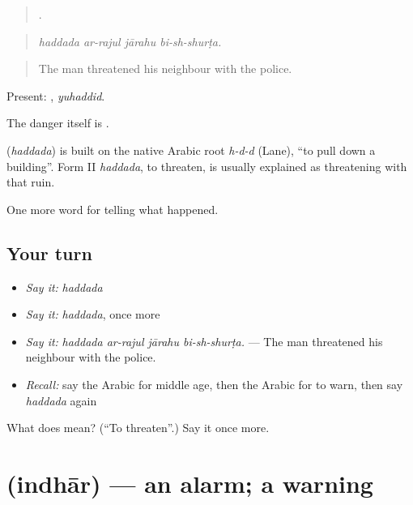 \begin{quote}
   .
\end{quote}

\begin{quote}
\emph{haddada ar-rajul jārahu bi-sh-shurṭa.}
\end{quote}

\begin{quote}
The man threatened his neighbour with the police.
\end{quote}

Present: , \emph{yuhaddid}.

The danger itself is .

\begin{cousinweb}
\textbf{} (\emph{haddada}) is built on the native Arabic root \emph{h-d-d} (Lane), \textquotedblleft{}to pull down a building\textquotedblright{}. Form II \emph{haddada}, to threaten, is usually explained as threatening with that ruin.
\end{cousinweb}

\begin{grammarlens}[title={What you've built}]
One more word for telling what happened.
\end{grammarlens}

\subsection*{Your turn}
\begin{itemize}
\raggedright
  \item \emph{Say it:} \emph{haddada}
  \item \emph{Say it:} \emph{haddada}, once more
  \item \emph{Say it:} \emph{haddada ar-rajul jārahu bi-sh-shurṭa.} — The man threatened his neighbour with the police.
  \item \emph{Recall:} say the Arabic for middle age, then the Arabic for to warn, then say \emph{haddada} again
\end{itemize}

\begin{tcolorbox}[breakable,colback=teal!4,colframe=teal!35!black,title={Before you move on}]
What does  mean? (\textquotedblleft{}To threaten\textquotedblright{}.) Say it once more.
\end{tcolorbox}
\section[\texorpdfstring{\ar{إنذار} (indhār)}{إنذار (indhār)}]{ (indhār) — an alarm; a warning}

